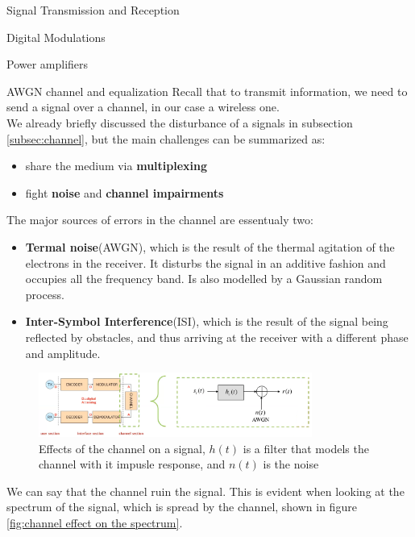 \begin{section}{Signal Transmission and Reception}
\begin{subsection}{Digital Modulations}
\begin{subsubsection}{Power amplifiers}
    \end{subsubsection}
  \end{subsection}

  \begin{subsection}{AWGN channel and equalization}
    Recall that to transmit information, we need to send a signal over a channel, in our case a 
    wireless one.\\
    We already briefly discussed the disturbance of a signals in subsection \ref{subsec:channel}, but the 
    main challenges can be summarized as:
    \begin{itemize}
      \item share the medium via \textbf{multiplexing}
      \item fight \textbf{noise} and \textbf{channel impairments}
    \end{itemize}
    The major sources of errors in the channel are essentualy two:
    \begin{itemize}
      \item \textbf{Termal noise}(AWGN), which is the result of the thermal agitation of the electrons
        in the receiver. It disturbs the signal in an additive fashion and occupies all the
        frequency band. Is also modelled by a Gaussian random process.
      \item \textbf{Inter-Symbol Interference}(ISI), which is the result of the signal being reflected
        by obstacles, and thus arriving at the receiver with a different phase and amplitude.
    \end{itemize}
    \begin{figure}[h]
      \centering
      \includegraphics[width=0.8\textwidth]{img/wireless/channel effect.png}
      \caption{Effects of the channel on a signal, $h(t)$ is a filter that models the channel with it impusle response,
        and $n(t)$ is the noise}
      \label{fig:channel effects}
    \end{figure}
    We can say that the channel ruin the signal. This is evident when looking at the spectrum of the
    signal, which is spread by the channel, shown in figure \ref{fig:channel effect on the spectrum}.\\
    \begin{figure}[h]

\end{figure}
\end{subsection}
\end{section}
